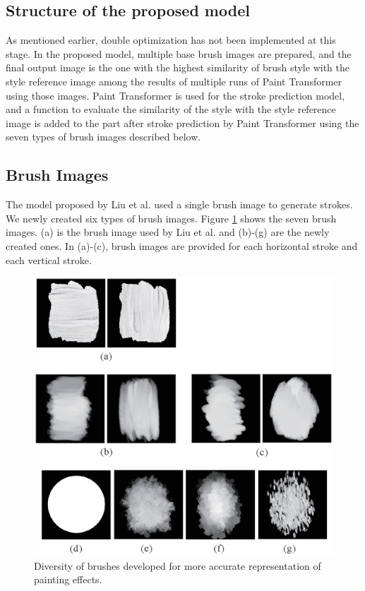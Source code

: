 \documentclass{mva_style}
\begin{document}
\subsection{Structure of the proposed model}
As mentioned earlier, double optimization has not been implemented at this 
stage. In the proposed model, multiple base brush images are prepared, and 
the final output image is the one with the highest similarity of brush style 
with the style reference image among the results of multiple runs of Paint 
Transformer using those images. 
Paint Transformer is used for the stroke prediction model, and a function to 
evaluate the similarity of the style with the style reference image is added 
to the part after stroke prediction by Paint Transformer using the seven 
types of brush images described below.

\subsection{Brush Images}
The model proposed by Liu et al. used a single brush image to generate strokes. 
We newly created six types of brush images. Figure \ref{fig:brushes} shows 
the seven brush images. (a) is the brush image used by Liu et al. and (b)-(g) 
are the newly created ones. In (a)-(c), brush images are provided for each 
horizontal stroke and each vertical stroke.

\begin{figure}[t]
    \centering
    \includegraphics[width=1.0\linewidth]{resource/brushes.eps}
    \caption{Diversity of brushes developed for more accurate representation of painting effects.}
    \label{fig:brushes}
\end{figure}
\end{document}
